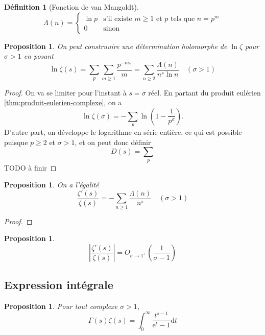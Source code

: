 \documentclass[french]{report}
\newtheorem{definition}[theorem]{Définition}
\newtheorem{proposition}[theorem]{Proposition}
\begin{document}
\begin{definition}[Fonction de van Mangoldt]
\[
  \Lambda(n)=
  \begin{cases}
    \ln p & \text{s'il existe $m\geq1$ et $p$ tels que $n=p^m$} \\
    0 & \text{sinon}
  \end{cases}
\]
\end{definition}

\begin{proposition}\label{eq:ln-zeta}
  On peut construuire une détermination holomorphe de $\ln\zeta$ pour $\sigma>1$ en posant
  \[ \ln\zeta(s) = \sum_p\sum_{m\geq1}\frac{p^{-ms}}{m}  = \sum_{n\geq2}\frac{\Lambda(n)}{n^s\ln n}\quad(\sigma>1) \]
\end{proposition}

\begin{proof}
  On va se limiter pour l'instant à $s=\sigma$ réel. En partant du produit eulérien \ref{thm:produit-eulerien-complexe}, on a
  \[ \ln\zeta(\sigma) = -\sum_p\ln\left(1-\frac{1}{p^\sigma}\right). \]
  D'autre part, on développe le logarithme en série entière, ce qui est possible puisque $p\geq2$ et $\sigma>1$, et on peut donc définir
  \[ D(s) = \sum_p \]
  TODO à finir
\end{proof}

\begin{proposition}\label{prop:zeta-van-mangoldt}
  On a l'égalité
  \[ \frac{\zeta'(s)}{\zeta(s)} = -\sum_{n\geq1}\frac{\Lambda(n)}{n^s}\quad(\sigma>1) \]
\end{proposition}

\begin{proof}
  
\end{proof}

\begin{proposition}\label{prop:zeta-sur-zeta-prime-o}
  \[ \left|\frac{\zeta'(s)}{\zeta(s)}\right| = O_{\sigma\to1^+}\left(\frac{1}{\sigma-1}\right) \]
\end{proposition}

\subsection{Expression intégrale}

\begin{proposition}
  Pour tout complexe $\sigma > 1$,
  \[ \Gamma(s)\zeta(s) = \int_0^\infty\frac{t^{s-1}}{\mathrm{e}^t-1}\mathrm{d}t \]
\end{proposition}
\end{document}
